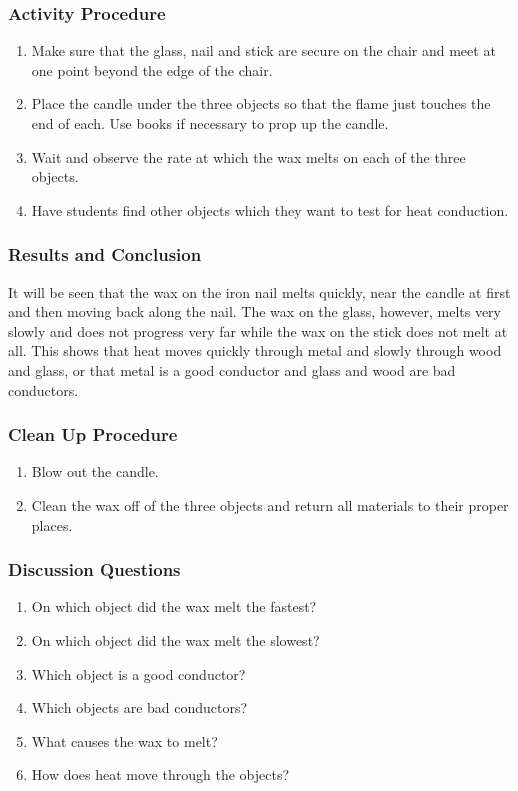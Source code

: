 \subsubsection*{Activity Procedure}
\begin{enumerate}
\item{Make sure that the glass, nail and stick are secure on the chair and meet at one point beyond the edge of the chair.} 
\item{Place the candle under the three objects so that the flame just touches the end of each. Use books if necessary to prop up the candle.} 
\item{Wait and observe the rate at which the wax melts on each of the three objects.} 
\item{Have students find other objects which they want to test for heat conduction.} 
\end{enumerate}

\subsubsection*{Results and Conclusion}
It will be seen that the wax on the iron nail melts quickly, near the candle at first and then moving back along the nail. The wax on the glass, however, melts very slowly and does not progress very far while the wax on the stick does not melt at all.  
This shows that heat moves quickly through metal and slowly through wood and glass, or that metal is a good conductor and glass and wood are bad conductors.  

\subsubsection*{Clean Up Procedure}
\begin{enumerate}
\item{Blow out the candle.} 
\item{Clean the wax off of the three objects and return all materials to their proper places.} 
\end{enumerate}

\subsubsection*{Discussion Questions}
\begin{enumerate}
\item{On which object did the wax melt the fastest?}
\item{On which object did the wax melt the slowest?}
\item{Which object is a good conductor?}
\item{Which objects are bad conductors?}
\item{What causes the wax to melt?}
\item{How does heat move through the objects?}
\end{enumerate}

